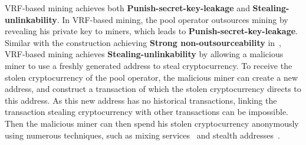VRF-based mining achieves both \textbf{Punish-secret-key-leakage} and \textbf{Stealing-unlinkability}.
In VRF-based mining, the pool operator outsources mining by revealing his private key to miners, which leads to \textbf{Punish-secret-key-leakage}.
Similar with the construction achieving \textbf{Strong non-outsourceability} in~\cite{miller2015nonoutsourceable}, VRF-based mining achieves \textbf{Stealing-unlinkability} by allowing a malicious miner to use a freshly generated address to steal cryptocurrency.
To receive the stolen cryptocurrency of the pool operator, the malicious miner can create a new address, and construct a transaction of which the stolen cryptocurrency directs to this address.
As this new address has no historical transactions, linking the transaction stealing cryptocurrency with other transactions can be impossible.
Then the malicious miner can then spend his stolen cryptocurrency anonymously using numerous techniques, such as mixing services~\cite{maxwell2013coinjoin}\cite{bonneau2014mixcoin}\cite{ruffing2014coinshuffle}\cite{heilman2017tumblebit} and stealth addresses~\cite{van2013cryptonote}.


